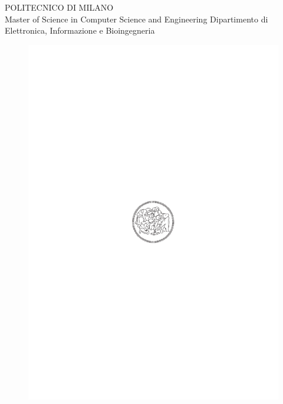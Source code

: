 \thispagestyle{empty}
\vspace*{-1.5cm}

\bfseries{
\begin{center}

\large
POLITECNICO DI MILANO\\
\normalsize
Master of Science in Computer Science and Engineering
Dipartimento di Elettronica, Informazione e Bioingegneria

 
\vspace{5mm}



\begin{figure}[h]
\begin{center}
\includegraphics{logo_polimi.pdf}
\end{center}
\end{figure}


\end{center}}

